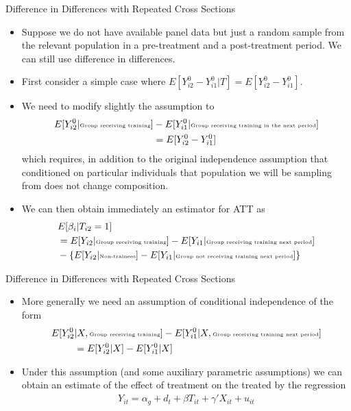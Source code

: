 \documentclass[xcolor=pdftex,dvipsnames,table,mathserif]{beamer}
\begin{document}
\begin{frame}{Difference in Differences with Repeated Cross Sections}
\begin{itemize}
\item Suppose we do not have available panel data but just a random sample from the relevant population in a pre-treatment and a post-treatment period. We can still use difference in differences.
\item First consider a simple case where {\small $E[Y_{i2}^0- Y_{i1}^0 | T] = E[Y_{i2}^0- Y_{i1}^0]$}.
\item We need to modify slightly the assumption to
\vspace{-.5pc}
\begin{align*}
E[Y_{i2}^0| \text{\tiny Group receiving training}]&-E[Y_{i1}^0| \text{\tiny Group receiving training in the next period}] \\
&= E[Y_{i2}^0-Y_{i1}^0]  
\end{align*}
which requires, in addition to the original independence
assumption that conditioned on particular individuals that population we will be sampling from does not change composition.
\item We can then obtain immediately an estimator for ATT as
\begin{align*}
&E[\beta_i |T_{i2}=1] \\ 
&= E[Y_{i2}| \text{\tiny Group receiving training}]-E[Y_{i1}| \text{\tiny Group receiving training next period}] \\
&- \{E[Y_{i2} | \text{\tiny Non-trainees}] - E[Y_{i1} | \text{\tiny Group not receiving training next period}]\}
\end{align*}
\end{itemize}
\end{frame}


\begin{frame}{Difference in Differences with Repeated Cross Sections}
\begin{itemize}
\item More generalIy we need an assumption of conditional independence of the form
\begin{align*}
E[Y_{i2}^0 & | X, \text{\tiny Group receiving training}]-E[Y_{i1}^0| X, \text{\tiny Group receiving training next period}] \\
&= E[Y_{i2}^0 | X] - E[Y_{i1}^0 |X]
\end{align*}
\item Under this assumption (and some auxiliary parametric assumptions) we can obtain an estimate of the effect of treatment on the treated by the regression
\begin{align*}
Y_{it} = \alpha_g + d_t + \beta T_{it} + \gamma' X_{it} + u_{it}
\end{align*} 
\end{itemize}
\end{frame}
\end{document}
